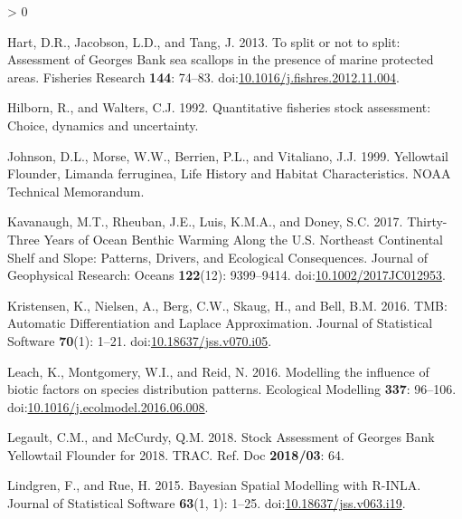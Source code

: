 \documentclass[
]{article}
\newlength{\cslhangindent}
\newenvironment{CSLReferences}[2] %
 {%
  \setlength{\parindent}{0pt}
  \ifodd #1 \everypar{\setlength{\hangindent}{\cslhangindent}}\ignorespaces\fi
  \ifnum #2 > 0
  \setlength{\parskip}{#2\baselineskip}
  \fi
 }%
 {}
\begin{document}
\begin{CSLReferences}{1}{0}
\leavevmode\hypertarget{ref-hartSplitNotSplit2013}{}%
Hart, D.R., Jacobson, L.D., and Tang, J. 2013. To split or not to split: {Assessment} of {Georges Bank} sea scallops in the presence of marine protected areas. Fisheries Research \textbf{144}: 74--83. doi:\href{https://doi.org/10.1016/j.fishres.2012.11.004}{10.1016/j.fishres.2012.11.004}.

\leavevmode\hypertarget{ref-hilbornQuantitativeFisheriesStock1992}{}%
Hilborn, R., and Walters, C.J. 1992. Quantitative fisheries stock assessment: Choice, dynamics and uncertainty.

\leavevmode\hypertarget{ref-johnsonYellowtailFlounderLimanda1999}{}%
Johnson, D.L., Morse, W.W., Berrien, P.L., and Vitaliano, J.J. 1999. Yellowtail {Flounder}, {Limanda} ferruginea, {Life History} and {Habitat Characteristics}. NOAA Technical Memorandum.

\leavevmode\hypertarget{ref-kavanaughThirtyThreeYearsOcean2017}{}%
Kavanaugh, M.T., Rheuban, J.E., Luis, K.M.A., and Doney, S.C. 2017. Thirty-{Three Years} of {Ocean Benthic Warming Along} the {U}.{S}. {Northeast Continental Shelf} and {Slope}: {Patterns}, {Drivers}, and {Ecological Consequences}. Journal of Geophysical Research: Oceans \textbf{122}(12): 9399--9414. doi:\href{https://doi.org/10.1002/2017JC012953}{10.1002/2017JC012953}.

\leavevmode\hypertarget{ref-kristensenTMBAutomaticDifferentiation2016}{}%
Kristensen, K., Nielsen, A., Berg, C.W., Skaug, H., and Bell, B.M. 2016. {TMB}: {Automatic Differentiation} and {Laplace Approximation}. Journal of Statistical Software \textbf{70}(1): 1--21. doi:\href{https://doi.org/10.18637/jss.v070.i05}{10.18637/jss.v070.i05}.

\leavevmode\hypertarget{ref-leachModellingInfluenceBiotic2016}{}%
Leach, K., Montgomery, W.I., and Reid, N. 2016. Modelling the influence of biotic factors on species distribution patterns. Ecological Modelling \textbf{337}: 96--106. doi:\href{https://doi.org/10.1016/j.ecolmodel.2016.06.008}{10.1016/j.ecolmodel.2016.06.008}.

\leavevmode\hypertarget{ref-legaultStockAssessmentGeorges2018}{}%
Legault, C.M., and McCurdy, Q.M. 2018. Stock {Assessment} of {Georges Bank Yellowtail Flounder} for 2018. TRAC. Ref. Doc \textbf{2018/03}: 64.

\leavevmode\hypertarget{ref-lindgrenBayesianSpatialModelling2015}{}%
Lindgren, F., and Rue, H. 2015. Bayesian {Spatial Modelling} with {R}-{INLA}. Journal of Statistical Software \textbf{63}(1, 1): 1--25. doi:\href{https://doi.org/10.18637/jss.v063.i19}{10.18637/jss.v063.i19}.


\end{CSLReferences}
\end{document}
